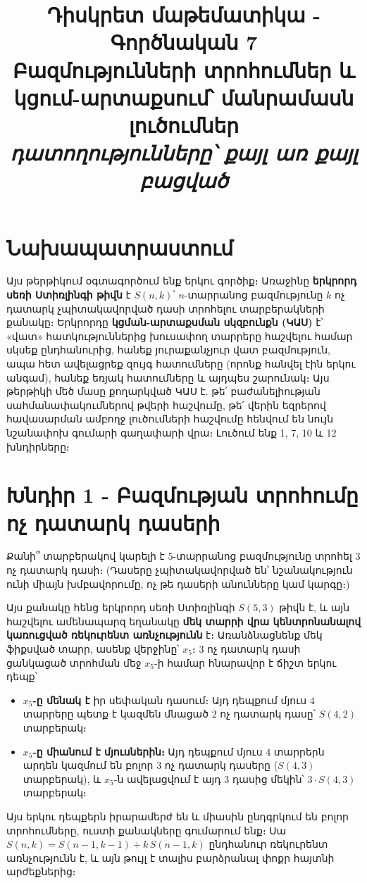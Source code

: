 \documentclass[11pt,a4paper]{article}
\title{\vspace{-1.2cm}\textbf{Դիսկրետ մաթեմատիկա - Գործնական 7}\\[2pt]
\large Բազմությունների տրոհումներ և կցում-արտաքսում՝ մանրամասն լուծումներ\\[2pt]
\normalsize\itshape դատողությունները՝ քայլ առ քայլ բացված}
\author{}
\date{}
\begin{document}
\maketitle
\vspace{-1.0cm}

\section*{Նախապատրաստում}
Այս թերթիկում օգտագործում ենք երկու գործիք։ Առաջինը \textbf{երկրորդ սեռի Ստիռլինգի թիվն} է $S(n,k)$՝
$n$-տարրանոց բազմությունը $k$ ոչ դատարկ չպիտակավորված դասի տրոհելու տարբերակների քանակը։ Երկրորդը
\textbf{կցման-արտաքսման սկզբունքն (ԿԱՍ)} է՝ «վատ» հատկություններից խուսափող տարրերը հաշվելու
համար սկսեք ընդհանուրից, հանեք յուրաքանչյուր վատ բազմություն, ապա հետ ավելացրեք զույգ հատումները
(որոնք հանվել էին երկու անգամ), հանեք եռյակ հատումները և այդպես շարունակ։ Այս թերթիկի մեծ մասը
քողարկված ԿԱՍ է. թե՛ բաժանելիության սահմանափակումներով թվերի հաշվումը, թե՛ վերին եզրերով
հավասարման ամբողջ լուծումների հաշվումը հենվում են նույն նշանափոխ գումարի գաղափարի վրա։ Լուծում ենք 1, 7, 10 և 12 խնդիրները։

\section*{Խնդիր 1 - Բազմության տրոհումը ոչ դատարկ դասերի}

\begin{problembox}[1]
Քանի՞ տարբերակով կարելի է $5$-տարրանոց բազմությունը տրոհել $3$ ոչ դատարկ դասի։ (Դասերը
չպիտակավորված են՝ նշանակություն ունի միայն խմբավորումը, ոչ թե դասերի անունները կամ կարգը։)
\end{problembox}

\begin{ideabox}
Այս քանակը հենց երկրորդ սեռի Ստիռլինգի $S(5,3)$ թիվն է, և այն հաշվելու ամենապարզ եղանակը \textbf{մեկ
տարրի վրա կենտրոնանալով կառուցված ռեկուրենտ առնչությունն} է։ Առանձնացնենք մեկ ֆիքսված տարր, ասենք
վերջինը՝ $x_5$։ $3$ ոչ դատարկ դասի ցանկացած տրոհման մեջ $x_5$-ի համար հնարավոր է ճիշտ երկու
դեպք՝
\begin{itemize}[nosep,leftmargin=2em]
  \item \textbf{$x_5$-ը մենակ է} իր սեփական դասում։ Այդ դեպքում մյուս $4$ տարրերը պետք է կազմեն
        մնացած $2$ ոչ դատարկ դասը՝ $S(4,2)$ տարբերակ։
  \item \textbf{$x_5$-ը միանում է մյուսներին։} Այդ դեպքում մյուս $4$ տարրերն արդեն կազմում են բոլոր
        $3$ ոչ դատարկ դասերը ($S(4,3)$ տարբերակ), և $x_5$-ն ավելացվում է այդ $3$ դասից մեկին՝
        $3\cdot S(4,3)$ տարբերակ։
\end{itemize}
Այս երկու դեպքերն իրարամերժ են և միասին ընդգրկում են բոլոր տրոհումները, ուստի քանակները գումարում ենք։ Սա
$S(n,k)=S(n-1,k-1)+k\,S(n-1,k)$ ընդհանուր ռեկուրենտ առնչությունն է, և այն թույլ է տալիս բարձրանալ
փոքր հայտնի արժեքներից։
\end{ideabox}
\end{document}
